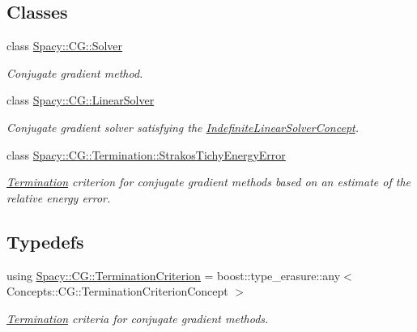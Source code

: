 \subsection*{Classes}
\begin{DoxyCompactItemize}
\item 
class \hyperlink{classSpacy_1_1CG_1_1Solver}{Spacy\+::\+C\+G\+::\+Solver}
\begin{DoxyCompactList}\small\item\em Conjugate gradient method. \end{DoxyCompactList}\item 
class \hyperlink{classSpacy_1_1CG_1_1LinearSolver}{Spacy\+::\+C\+G\+::\+Linear\+Solver}
\begin{DoxyCompactList}\small\item\em Conjugate gradient solver satisfying the \hyperlink{group__ConceptGroup_ga582dd34334cdecc7b27883f4e8239490_IndefiniteLinearSolverConceptAnchor}{Indefinite\+Linear\+Solver\+Concept}. \end{DoxyCompactList}\item 
class \hyperlink{classSpacy_1_1CG_1_1Termination_1_1StrakosTichyEnergyError}{Spacy\+::\+C\+G\+::\+Termination\+::\+Strakos\+Tichy\+Energy\+Error}
\begin{DoxyCompactList}\small\item\em \hyperlink{namespaceSpacy_1_1CG_1_1Termination}{Termination} criterion for conjugate gradient methods based on an estimate of the relative energy error. \end{DoxyCompactList}\end{DoxyCompactItemize}
\subsection*{Typedefs}
\begin{DoxyCompactItemize}
\item 
using \hyperlink{group__CGGroup_gaa927be31b313bb4ce635668c77b55860_gaa927be31b313bb4ce635668c77b55860}{Spacy\+::\+C\+G\+::\+Termination\+Criterion} = boost\+::type\+\_\+erasure\+::any$<$ Concepts\+::\+C\+G\+::\+Termination\+Criterion\+Concept $>$
\begin{DoxyCompactList}\small\item\em \hyperlink{namespaceSpacy_1_1CG_1_1Termination}{Termination} criteria for conjugate gradient methods. \end{DoxyCompactList}\end{DoxyCompactItemize}
